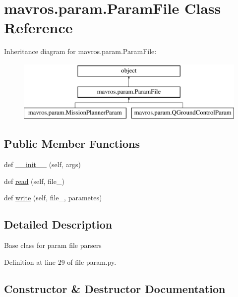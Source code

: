 \hypertarget{classmavros_1_1param_1_1ParamFile}{}\section{mavros.\+param.\+Param\+File Class Reference}
\label{classmavros_1_1param_1_1ParamFile}
Inheritance diagram for mavros.\+param.\+Param\+File\+:\begin{figure}[H]
\begin{center}
\leavevmode
\includegraphics[height=3.000000cm]{classmavros_1_1param_1_1ParamFile}
\end{center}
\end{figure}
\subsection*{Public Member Functions}
\begin{DoxyCompactItemize}
\item 
def \mbox{\hyperlink{classmavros_1_1param_1_1ParamFile_ab158256d13adb9a5354ad2ef27aee73b}{\+\_\+\+\_\+init\+\_\+\+\_\+}} (self, args)
\item 
def \mbox{\hyperlink{classmavros_1_1param_1_1ParamFile_adb004524182c02e4bd16705c259895d2}{read}} (self, file\+\_\+)
\item 
def \mbox{\hyperlink{classmavros_1_1param_1_1ParamFile_ad1027ff8e4ed8681f36e096447d110bb}{write}} (self, file\+\_\+, parametes)
\end{DoxyCompactItemize}


\subsection{Detailed Description}
\begin{DoxyVerb}Base class for param file parsers\end{DoxyVerb}
 

Definition at line 29 of file param.\+py.



\subsection{Constructor \& Destructor Documentation}
\mbox{\label{classmavros_1_1param_1_1ParamFile_ab158256d13adb9a5354ad2ef27aee73b}} 
